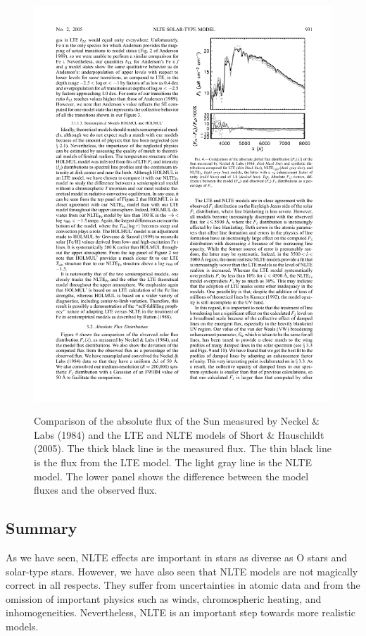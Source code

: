 \begin{figure}
\includegraphics[width=\linewidth]{figures/short-hauschild-flux.pdf}
\label{figure:short-hauschild-flux}
\caption{Comparison of the absolute flux of the Sun measured by Neckel \& Labs (1984) and the LTE and NLTE models of Short \& Hauschildt (2005). The thick black line is the measured flux. The thin black line is the flux from the LTE model. The light gray line is the NLTE model. The lower panel shows the difference between the model fluxes and the observed flux.}
\end{figure}

\newslide

\subsection{Summary}

As we have seen, NLTE effects are important in stars as diverse as O stars and solar-type stars. However, we have also seen that NLTE models are not magically correct in all respects. They suffer from uncertainties in atomic data and from the omission of important physics such as winds, chromospheric heating, and inhomogeneities. Nevertheless, NLTE is an important step towards more realistic models.


